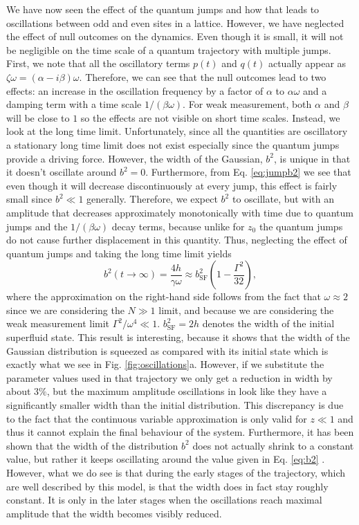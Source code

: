We have now seen the effect of the quantum jumps and how that leads to
oscillations between odd and even sites in a lattice. However, we have
neglected the effect of null outcomes on the dynamics. Even though it
is small, it will not be negligible on the time scale of a quantum
trajectory with multiple jumps. First, we note that all the
oscillatory terms $p(t)$ and $q(t)$ actually appear as
$\zeta \omega = (\alpha - i \beta) \omega$. Therefore, we can see that
the null outcomes lead to two effects: an increase in the oscillation
frequency by a factor of $\alpha$ to $\alpha \omega$ and a damping
term with a time scale $1/(\beta \omega)$. For weak measurement, both
$\alpha$ and $\beta$ will be close to $1$ so the effects are not
visible on short time scales. Instead, we look at the long time
limit. Unfortunately, since all the quantities are oscillatory a
stationary long time limit does not exist especially since the quantum
jumps provide a driving force. However, the width of the Gaussian,
$b^2$, is unique in that it doesn't oscillate around $b^2 =
0$. Furthermore, from Eq. \eqref{eq:jumpb2} we see that even though it
will decrease discontinuously at every jump, this effect is fairly
small since $b^2 \ll 1$ generally. Therefore, we expect $b^2$ to
oscillate, but with an amplitude that decreases approximately
monotonically with time due to quantum jumps and the
$1/(\beta \omega)$ decay terms, because unlike for $z_0$ the quantum
jumps do not cause further displacement in this quantity. Thus,
neglecting the effect of quantum jumps and taking the long time limit
yields
\begin{equation}
  \label{eq:b2}
  b^2(t \rightarrow \infty) = \frac{4 h} {\gamma \omega} \approx
  b^2_\mathrm{SF} \left( 1 - \frac{\Gamma^2}{32} \right),
\end{equation}
where the approximation on the right-hand side follows from the fact
that $\omega \approx 2$ since we are considering the $N \gg 1$ limit,
and because we are considering the weak measurement limit
$\Gamma^2 / \omega^4 \ll 1$. $b^2_\mathrm{SF} = 2h$ denotes the width
of the initial superfluid state. This result is interesting, because
it shows that the width of the Gaussian distribution is squeezed as
compared with its initial state which is exactly what we see in
Fig. \ref{fig:oscillations}a. However, if we substitute the parameter
values used in that trajectory we only get a reduction in width by
about $3\%$, but the maximum amplitude oscillations in look like they
have a significantly smaller width than the initial distribution. This
discrepancy is due to the fact that the continuous variable
approximation is only valid for $z \ll 1$ and thus it cannot explain
the final behaviour of the system. Furthermore, it has been shown that
the width of the distribution $b^2$ does not actually shrink to a
constant value, but rather it keeps oscillating around the value given
in Eq. \eqref{eq:b2} \cite{mazzucchi2016njp}. However, what we do see
is that during the early stages of the trajectory, which are well
described by this model, is that the width does in fact stay roughly
constant. It is only in the later stages when the oscillations reach
maximal amplitude that the width becomes visibly reduced.

